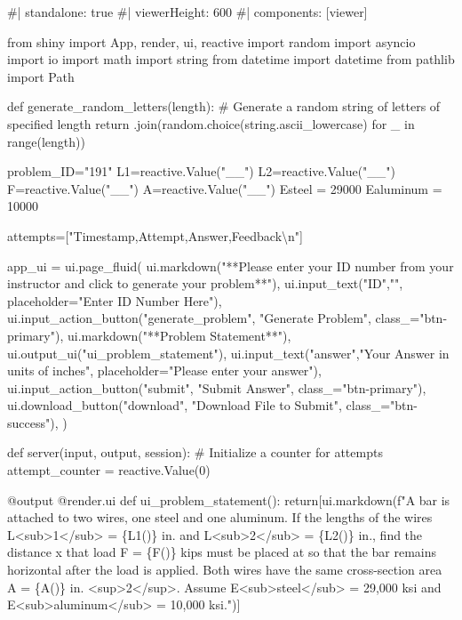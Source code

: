 \documentclass[
  letterpaper,
  DIV=11,
  numbers=noendperiod]{scrreprt}
\newenvironment{Shaded}{\begin{snugshade}}{\end{snugshade}}
\newcommand{\NormalTok}[1]{\textcolor[rgb]{0.00,0.23,0.31}{#1}}
\begin{document}
\begin{Shaded}
\begin{Highlighting}[]
\NormalTok{\#| standalone: true}
\NormalTok{\#| viewerHeight: 600}
\NormalTok{\#| components: [viewer]}

\NormalTok{from shiny import App, render, ui, reactive}
\NormalTok{import random}
\NormalTok{import asyncio}
\NormalTok{import io}
\NormalTok{import math}
\NormalTok{import string}
\NormalTok{from datetime import datetime}
\NormalTok{from pathlib import Path}

\NormalTok{def generate\_random\_letters(length):}
\NormalTok{    \# Generate a random string of letters of specified length}
\NormalTok{    return \textquotesingle{}\textquotesingle{}.join(random.choice(string.ascii\_lowercase) for \_ in range(length))}

\NormalTok{problem\_ID="191"}
\NormalTok{L1=reactive.Value("\_\_")}
\NormalTok{L2=reactive.Value("\_\_")}
\NormalTok{F=reactive.Value("\_\_")}
\NormalTok{A=reactive.Value("\_\_")}
\NormalTok{Esteel = 29000}
\NormalTok{Ealuminum = 10000}


\NormalTok{attempts=["Timestamp,Attempt,Answer,Feedback\textbackslash{}n"]}

\NormalTok{app\_ui = ui.page\_fluid(}
\NormalTok{    ui.markdown("**Please enter your ID number from your instructor and click to generate your problem**"),}
\NormalTok{    ui.input\_text("ID","", placeholder="Enter ID Number Here"),}
\NormalTok{    ui.input\_action\_button("generate\_problem", "Generate Problem", class\_="btn{-}primary"),}
\NormalTok{    ui.markdown("**Problem Statement**"),}
\NormalTok{    ui.output\_ui("ui\_problem\_statement"),}
\NormalTok{    ui.input\_text("answer","Your Answer in units of inches", placeholder="Please enter your answer"),}
\NormalTok{    ui.input\_action\_button("submit", "Submit Answer", class\_="btn{-}primary"),}
\NormalTok{    ui.download\_button("download", "Download File to Submit", class\_="btn{-}success"),}
\NormalTok{)}


\NormalTok{def server(input, output, session):}
\NormalTok{    \# Initialize a counter for attempts}
\NormalTok{    attempt\_counter = reactive.Value(0)}

\NormalTok{    @output}
\NormalTok{    @render.ui}
\NormalTok{    def ui\_problem\_statement():}
\NormalTok{        return[ui.markdown(f"A bar is attached to two wires, one steel and one aluminum. If the lengths of the wires L\textless{}sub\textgreater{}1\textless{}/sub\textgreater{} = \{L1()\} in. and L\textless{}sub\textgreater{}2\textless{}/sub\textgreater{} = \{L2()\} in., find the distance x that load F = \{F()\} kips must be placed at so that the bar remains horizontal after the load is applied. Both wires have the same cross{-}section area A = \{A()\} in. \textless{}sup\textgreater{}2\textless{}/sup\textgreater{}. Assume E\textless{}sub\textgreater{}steel\textless{}/sub\textgreater{} = 29,000 ksi and E\textless{}sub\textgreater{}aluminum\textless{}/sub\textgreater{} = 10,000 ksi.")]}
    

\end{Highlighting}
\end{Shaded}
\end{document}
